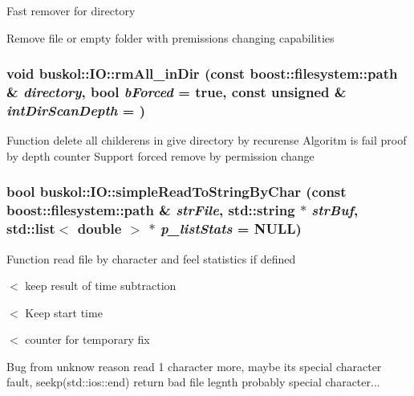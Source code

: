 Fast remover for directory

Remove file or empty folder with premissions changing capabilities 

\hypertarget{group__libbuskol_gab3ce3dff1ea5fedde1eff01ae94297ae}{
\subsubsection[{rmAll\_\-inDir}]{\setlength{\rightskip}{0pt plus 5cm}void buskol::IO::rmAll\_\-inDir (const boost::filesystem::path \& {\em directory}, \/  bool {\em bForced} = {\ttfamily true}, \/  const unsigned \& {\em intDirScanDepth} = {})}}
\label{group__libbuskol_gab3ce3dff1ea5fedde1eff01ae94297ae}
Function delete all childerens in give directory by recurense Algoritm is fail proof by depth counter Support forced remove by permission change \hypertarget{group__libbuskol_gaa00dee734dcb4383da401abcaa508c70}{
\subsubsection[{simpleReadToStringByChar}]{\setlength{\rightskip}{0pt plus 5cm}bool buskol::IO::simpleReadToStringByChar (const boost::filesystem::path \& {\em strFile}, \/  std::string $\ast$ {\em strBuf}, \/  std::list$<$ double $>$ $\ast$ {\em p\_\-listStats} = {\ttfamily NULL})}}
\label{group__libbuskol_gaa00dee734dcb4383da401abcaa508c70}
Function read file by character and feel statistics if defined 

$<$ keep result of time subtraction

$<$ Keep start time

$<$ counter for temporary fix

Bug from unknow reason read 1 character more, maybe its special character fault, seekp(std::ios::end) return bad file legnth probably special character... 

